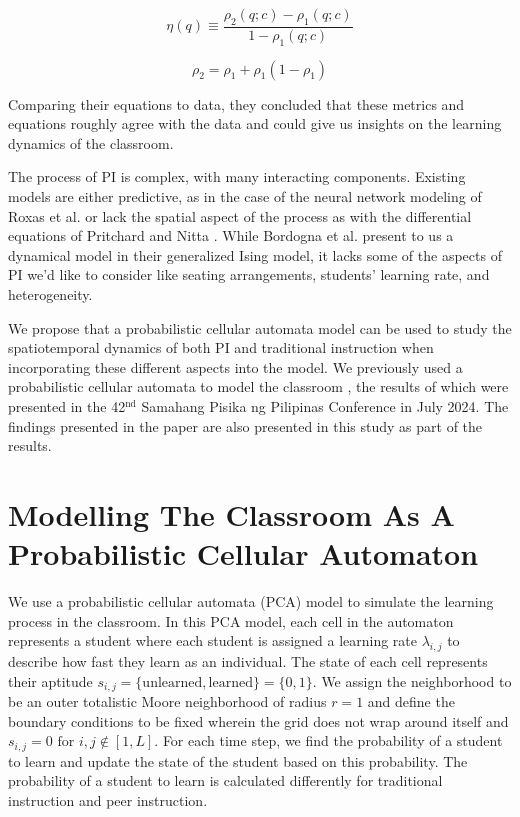 \documentclass[twocolumn,secnumarabic,amssymb, nobibnotes, aps, prd]{revtex4-2}
\begin{document}
    \begin{equation}
        \label{eq: PIE}
        \eta(q) \equiv \frac{\rho_2(q;c)-\rho_1(q;c)}{1-\rho_1(q;c)}
    \end{equation}

    \begin{equation}
        \label{eq: nitta model}
        \rho_2 = \rho_1 +\rho_1(1-\rho_1)
    \end{equation}

    Comparing their equations to data, they concluded that these metrics and equations roughly agree with the data and could give us insights on the learning dynamics of the classroom.

    The process of PI is complex, with many interacting components.
    Existing models are either predictive, as in the case of the neural network modeling of Roxas et al. \cite{roxas2010seating} or lack the spatial aspect of the process as with the differential equations of Pritchard \cite{pritchard2008mathematical} and Nitta \cite{nitta2019mathematical}.
    While Bordogna et al. \cite{bordogna2001theoretical,bordogna2003simulation} present to us a dynamical model in their generalized Ising model, it lacks some of the aspects of PI we'd like to consider like seating arrangements, students' learning rate, and heterogeneity.

    We propose that a probabilistic cellular automata model can be used to study the spatiotemporal dynamics of both PI and traditional instruction when incorporating these different aspects into the model.
    We previously used a probabilistic cellular automata to model the classroom \cite{SelfSPP}, the results of which were presented in the 42$^{\text{nd}}$ Samahang Pisika ng Pilipinas Conference in July 2024.
    The findings presented in the paper are also presented in this study as part of the results.

\section{Modelling The Classroom As A Probabilistic Cellular Automaton}

    We use a probabilistic cellular automata (PCA) model to simulate the learning process in the classroom.
    In this PCA model, each cell in the automaton represents a student where each student is assigned a learning rate $\lambda_{i,j}$ to describe how fast they learn as an individual.
    The state of each cell represents their aptitude $s_{i,j}=\lbrace\text{unlearned},\text{learned}\rbrace=\lbrace0,1\rbrace$.
    We assign the neighborhood to be an outer totalistic Moore neighborhood of radius $r=1$ and define the boundary conditions to be fixed wherein the grid does not wrap around itself and $s_{i,j}=0 \text{ for }i,j\notin[1,L]$.
    For each time step, we find the probability of a student to learn and update the state of the student based on this probability.
    The probability of a student to learn is calculated differently for traditional instruction and peer instruction.
\end{document}
